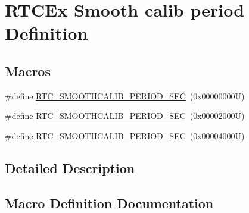 \hypertarget{group___r_t_c_ex___smooth__calib__period___definitions}{}\section{R\+T\+C\+Ex Smooth calib period Definition}
\label{group___r_t_c_ex___smooth__calib__period___definitions}
\subsection*{Macros}
\begin{DoxyCompactItemize}
\item 
\#define \hyperlink{group___r_t_c_ex___smooth__calib__period___definitions_gaab8a844313898595cd72f86570198e5a}{R\+T\+C\+\_\+\+S\+M\+O\+O\+T\+H\+C\+A\+L\+I\+B\+\_\+\+P\+E\+R\+I\+O\+D\+\_\+S\+EC}~(0x00000000\+U)
\item 
\#define \hyperlink{group___r_t_c_ex___smooth__calib__period___definitions_ga0c192bdebd2496f60b8a4aa7db499262}{R\+T\+C\+\_\+\+S\+M\+O\+O\+T\+H\+C\+A\+L\+I\+B\+\_\+\+P\+E\+R\+I\+O\+D\+\_\+S\+EC}~(0x00002000\+U)
\item 
\#define \hyperlink{group___r_t_c_ex___smooth__calib__period___definitions_ga0993db27ee5b25c8db41c8e58b478ffe}{R\+T\+C\+\_\+\+S\+M\+O\+O\+T\+H\+C\+A\+L\+I\+B\+\_\+\+P\+E\+R\+I\+O\+D\+\_\+S\+EC}~(0x00004000\+U)
\end{DoxyCompactItemize}


\subsection{Detailed Description}


\subsection{Macro Definition Documentation}
\mbox{\label{group___r_t_c_ex___smooth__calib__period___definitions_ga0c192bdebd2496f60b8a4aa7db499262}} 
